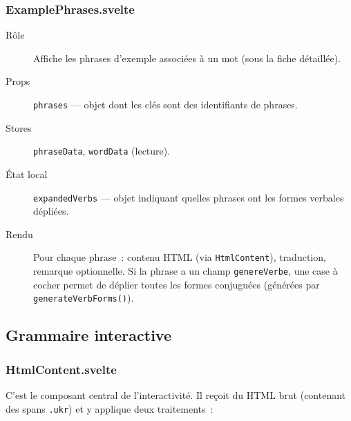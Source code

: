 \subsubsection{ExamplePhrases.svelte}

\begin{description}
  \item[Rôle] Affiche les phrases d'exemple associées à un mot (sous la fiche détaillée).
  \item[Props] \texttt{phrases} --- objet dont les clés sont des identifiants de phrases.
  \item[Stores] \texttt{phraseData}, \texttt{wordData} (lecture).
  \item[État local] \texttt{expandedVerbs} --- objet indiquant quelles phrases ont les formes verbales dépliées.
  \item[Rendu] Pour chaque phrase~: contenu HTML (via \texttt{HtmlContent}), traduction, remarque optionnelle. Si la phrase a un champ \texttt{genereVerbe}, une case à cocher permet de déplier toutes les formes conjuguées (générées par \texttt{generateVerbForms()}).
\end{description}

\subsection{Grammaire interactive}

\subsubsection{HtmlContent.svelte}

C'est le composant central de l'interactivité. Il reçoit du HTML brut (contenant des spans \texttt{.ukr}) et y applique deux traitements~:

